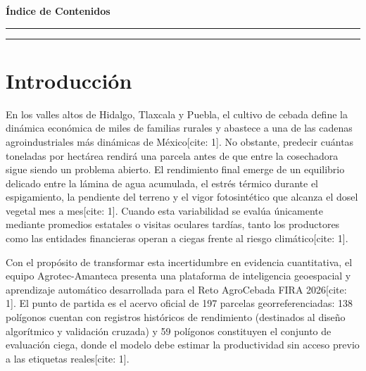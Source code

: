 \documentclass[11pt,a4paper]{article}
\begin{document}
\vspace*{0.2cm}
{\sffamily\Large\bfseries\color{forestdeep} Índice de Contenidos}
\vspace{0.15cm}
{\color{amberwarm}\rule{\textwidth}{1.2pt}}

\makeatletter
{}
\makeatother

\vspace{0.8cm}
\noindent\textcolor{borderline}{\rule{\textwidth}{0.6pt}}

\section{Introducción}
En los valles altos de Hidalgo, Tlaxcala y Puebla, el cultivo de cebada define la dinámica económica de miles de familias rurales y abastece a una de las cadenas agroindustriales más dinámicas de México[cite: 1]. No obstante, predecir cuántas toneladas por hectárea rendirá una parcela antes de que entre la cosechadora sigue siendo un problema abierto. El rendimiento final emerge de un equilibrio delicado entre la lámina de agua acumulada, el estrés térmico durante el espigamiento, la pendiente del terreno y el vigor fotosintético que alcanza el dosel vegetal mes a mes[cite: 1]. Cuando esta variabilidad se evalúa únicamente mediante promedios estatales o visitas oculares tardías, tanto los productores como las entidades financieras operan a ciegas frente al riesgo climático[cite: 1].

Con el propósito de transformar esta incertidumbre en evidencia cuantitativa, el equipo Agrotec-Amanteca presenta una plataforma de inteligencia geoespacial y aprendizaje automático desarrollada para el Reto AgroCebada FIRA 2026[cite: 1]. El punto de partida es el acervo oficial de 197 parcelas georreferenciadas: 138 polígonos cuentan con registros históricos de rendimiento (destinados al diseño algorítmico y validación cruzada) y 59 polígonos constituyen el conjunto de evaluación ciega, donde el modelo debe estimar la productividad sin acceso previo a las etiquetas reales[cite: 1].
\end{document}

